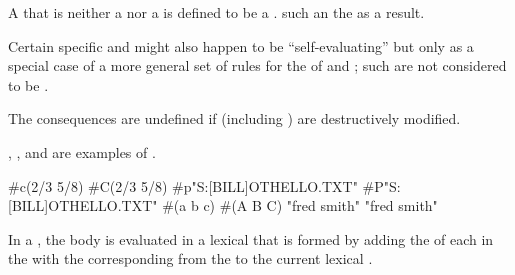 \endsubsubsubsubsection%

\endsubsubsubsection%


A  that is neither a  nor a  is 
defined to be a .  
such an   the   
as a result.

Certain specific  and  might also happen 
to be ``self-evaluating'' but only as a special case of a more 
general set of rules for the  of  and
; such  are not considered to be
.

The consequences are undefined if  (including
) are destructively modified.


, , and  are examples of
.

 
 #c(2/3 5/8) \EV #C(2/3 5/8)
 #p"S:[BILL]OTHELLO.TXT" \EV #P"S:[BILL]OTHELLO.TXT"
 #(a b c) \EV #(A B C)
 "fred smith" \EV "fred smith"
\endcode

\endsubsubsubsubsection%

\endsubsubsubsection%

\endsubsubsection%

\endSubsection%




In a ,
the body is evaluated in a lexical  that is formed by
adding the  of 
each  in the 
with the corresponding  from the 
to the current lexical .

